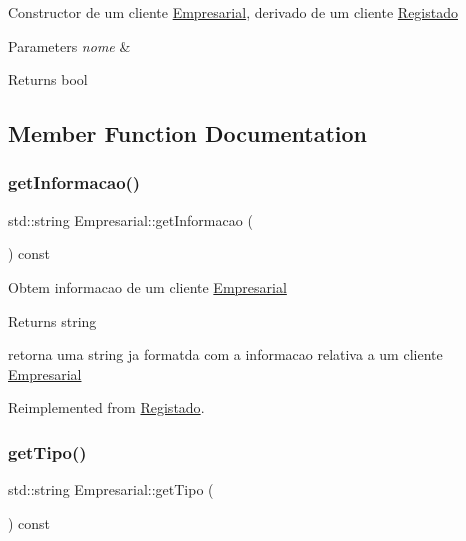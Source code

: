 Constructor de um cliente \hyperlink{class_empresarial}{Empresarial}, derivado de um cliente \hyperlink{class_registado}{Registado}


\begin{DoxyParams}{Parameters}
{\em nome} & \\
\hline
\end{DoxyParams}
\begin{DoxyReturn}{Returns}
bool 
\end{DoxyReturn}


\subsection{Member Function Documentation}
\mbox{\label{class_empresarial_a28090b6b3db16b6b7ba03d6308c2c309}} 
\subsubsection{\texorpdfstring{get\+Informacao()}{getInformacao()}}
{\footnotesize\ttfamily std\+::string Empresarial\+::get\+Informacao (\begin{DoxyParamCaption}{ }\end{DoxyParamCaption}) const\hspace{0.3cm}{\ttfamily [virtual]}}

Obtem informacao de um cliente \hyperlink{class_empresarial}{Empresarial}

\begin{DoxyReturn}{Returns}
string
\end{DoxyReturn}
retorna uma string ja formatda com a informacao relativa a um cliente \hyperlink{class_empresarial}{Empresarial} 

Reimplemented from \hyperlink{class_registado_a7017f0d74afd44459c3d6affcb303d52}{Registado}.

\mbox{\label{class_empresarial_a3d5d89f5a446fdcca0955d289592edaf}} 
\subsubsection{\texorpdfstring{get\+Tipo()}{getTipo()}}
{\footnotesize\ttfamily std\+::string Empresarial\+::get\+Tipo (\begin{DoxyParamCaption}{ }\end{DoxyParamCaption}) const\hspace{0.3cm}{\ttfamily [virtual]}}

